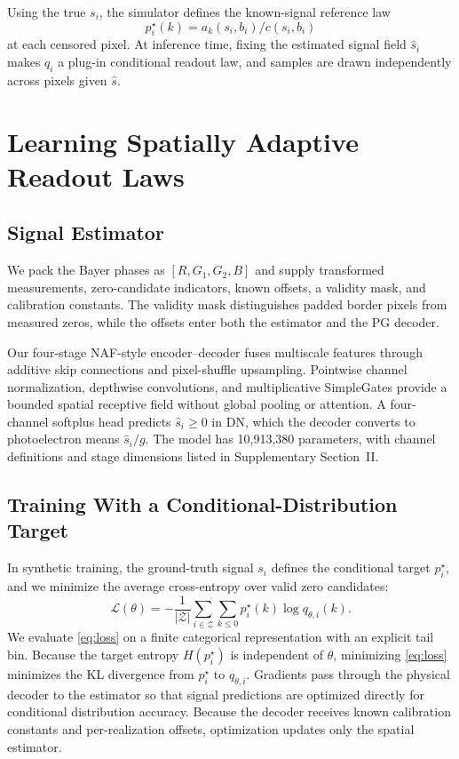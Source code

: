 \documentclass[10pt,twocolumn,journal]{IEEEtran}
\begin{document}
Using the true $s_i$, the simulator defines the known-signal reference law
\begin{equation}
p^{\star}_i(k)=a_k(s_i,b_i)/c(s_i,b_i)\label{eq:oracle}
\end{equation}
at each censored pixel. At inference time, fixing the estimated signal field $\hat s_i$ makes $q_i$ a plug-in conditional readout law, and samples are drawn independently across pixels given $\hat s$.

\section{Learning Spatially Adaptive Readout Laws}
\subsection{Signal Estimator}
We pack the Bayer phases as $[R,G_1,G_2,B]$ and supply transformed measurements, zero-candidate indicators, known offsets, a validity mask, and calibration constants. The validity mask distinguishes padded border pixels from measured zeros, while the offsets enter both the estimator and the PG decoder.

Our four-stage NAF-style encoder--decoder fuses multiscale features through additive skip connections and pixel-shuffle upsampling. Pointwise channel normalization, depthwise convolutions, and multiplicative SimpleGates provide a bounded spatial receptive field without global pooling or attention. A four-channel softplus head predicts $\hat s_i\geq0$ in DN, which the decoder converts to photoelectron means $\hat s_i/g$. The model has 10,913,380 parameters, with channel definitions and stage dimensions listed in Supplementary Section~II.

\subsection{Training With a Conditional-Distribution Target}
In synthetic training, the ground-truth signal $s_i$ defines the conditional target $p_i^\star$, and we minimize the average cross-entropy over valid zero candidates:
\begin{equation}
\mathcal L(\theta)=-\frac{1}{|\mathcal Z|}
\sum_{i\in\mathcal Z}\sum_{k\leq0}p^{\star}_i(k)\log q_{\theta,i}(k).
\label{eq:loss}
\end{equation}
We evaluate \eqref{eq:loss} on a finite categorical representation with an explicit tail bin. Because the target entropy $H(p_i^\star)$ is independent of $\theta$, minimizing \eqref{eq:loss} minimizes the KL divergence from $p_i^\star$ to $q_{\theta,i}$. Gradients pass through the physical decoder to the estimator so that signal predictions are optimized directly for conditional distribution accuracy. Because the decoder receives known calibration constants and per-realization offsets, optimization updates only the spatial estimator.
\end{document}
